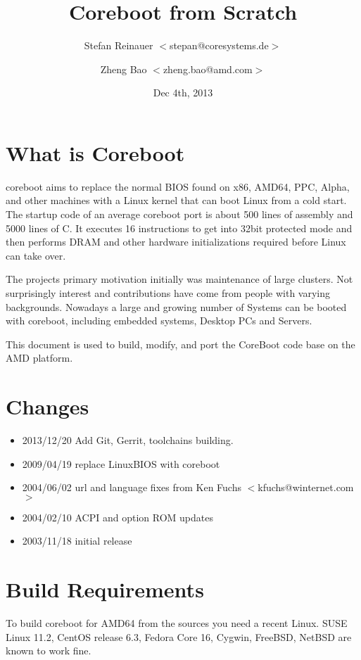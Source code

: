 \documentclass[titlepage,12pt]{article}
\title{Coreboot from Scratch}
\author{Stefan Reinauer $<$stepan@coresystems.de$>$\and Zheng Bao $<$zheng.bao@amd.com$>$}
\date{Dec 4th, 2013}
\begin{document}
\maketitle

\thispagestyle{empty}

\tableofcontents

\newpage

\section{What is Coreboot}
coreboot aims to replace the normal BIOS found on x86, AMD64, PPC,
Alpha, and other machines with a Linux kernel that can boot Linux from a cold
start. The startup code of an average coreboot port is about 500 lines of
assembly and 5000 lines of C. It executes 16 instructions to get into 32bit
protected mode and then performs DRAM and other hardware initializations
required before Linux can take over.

The projects primary motivation initially was maintenance of large
clusters. Not surprisingly interest and contributions have come from
people with varying backgrounds.  Nowadays a large and growing number of
Systems can be booted with coreboot, including embedded systems,
Desktop PCs and Servers.

This document is used to build, modify, and port the CoreBoot code
base on the AMD platform.


\section{Changes}

 \begin{itemize}
 \item 2013/12/20 Add Git, Gerrit, toolchains building.
 \item 2009/04/19 replace LinuxBIOS with coreboot
 \item 2004/06/02 url and language fixes from Ken Fuchs $<$kfuchs@winternet.com$>$
 \item 2004/02/10 ACPI and option ROM updates
 \item 2003/11/18 initial release
 \end{itemize}

%
%

\section{Build Requirements}
To build coreboot for AMD64 from the sources you need a recent Linux.
SUSE Linux 11.2, CentOS release 6.3, Fedora Core 16, Cygwin, FreeBSD,
NetBSD are known to work fine.
\end{document}
